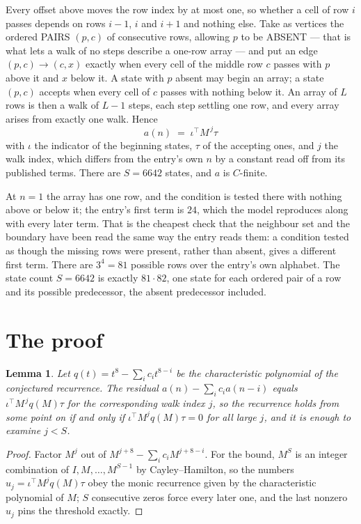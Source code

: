 \documentclass[11pt,a4paper]{article}
\theoremstyle{plain}
\newtheorem{lemma}[theorem]{Lemma}
\theoremstyle{definition}
\begin{document}
Every offset above moves the row index by at most one, so whether a cell of row $i$ passes
depends on rows $i-1$, $i$ and $i+1$ and nothing else. Take as vertices the ordered PAIRS
$(p,c)$ of consecutive rows, allowing $p$ to be ABSENT --- that is what lets a walk of no steps
describe a one-row array --- and put an edge $(p,c)\to(c,x)$ exactly when every cell of the
middle row $c$ passes with $p$ above it and $x$ below it. A state with $p$ absent may begin an
array; a state $(p,c)$ accepts when every cell of $c$ passes with nothing below it. An array of
$L$ rows is then a walk of $L-1$ steps, each step settling one row, and every array arises from
exactly one walk. Hence
\[
a(n)\;=\;\iota^{\!\top}M^{\,j}\tau
\]
with $\iota$ the indicator of the beginning states, $\tau$ of the accepting ones, and $j$ the
walk index, which differs from the entry's own $n$ by a constant read off from its published
terms. There are $S=6642$ states, and $a$ is $C$-finite.

At $n=1$ the array has one row, and
the condition is tested there with nothing above or below it; the entry's first term is
$24$, which the model reproduces along with every later term. That is the cheapest check
that the neighbour set and the boundary have been read the same way the entry reads them: a
condition tested as though the missing rows were present, rather than absent, gives a different
first term. There are $3^{4}=81$ possible rows over the entry's own alphabet. The state count $S=6642$ is exactly $81\cdot82$,
one state for each ordered pair of a row and its possible predecessor, the absent predecessor
included.

\section{The proof}

\begin{lemma}\label{lem:crit}
Let $q(t)=t^{8}-\sum_i c_it^{8-i}$ be the characteristic polynomial of the
conjectured recurrence. The residual $a(n)-\sum_ic_ia(n-i)$ equals
$\iota^{\!\top}M^{\,j}q(M)\tau$ for the corresponding walk index $j$, so the recurrence
holds from some point on if and only if $\iota^{\!\top}M^{j}q(M)\tau=0$ for all large $j$,
and it is enough to examine $j<S$.
\end{lemma}

\begin{proof}
Factor $M^{j}$ out of $M^{j+8}-\sum_ic_iM^{j+8-i}$. For the bound, $M^{S}$
is an integer combination of $I,M,\dots,M^{S-1}$ by Cayley--Hamilton, so the numbers
$u_j=\iota^{\!\top}M^{j}q(M)\tau$ obey the monic recurrence given by the characteristic
polynomial of $M$; $S$ consecutive zeros force every later one, and the last nonzero $u_j$
pins the threshold exactly.
\end{proof}
\end{document}
